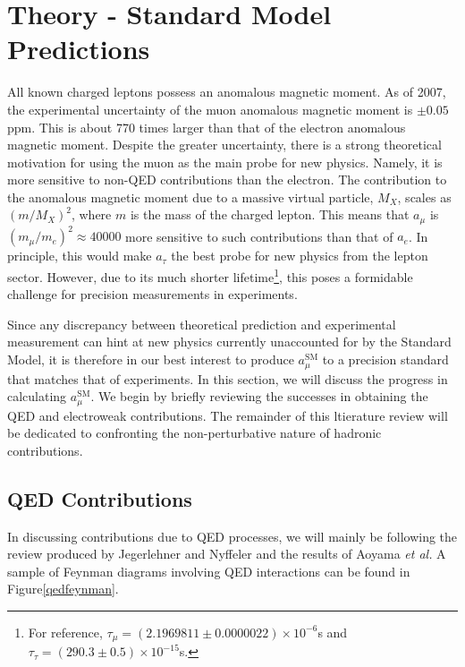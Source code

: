 \documentclass{article}
\numberwithin{equation}{section} %
\begin{document}



\section{Theory - Standard Model Predictions}\label{th}

All known charged leptons possess an anomalous magnetic moment. As of 2007, the experimental uncertainty of the muon anomalous magnetic moment is $\pm0.05$ppm. This is about 770 times larger than that of the electron anomalous magnetic moment\cite{millerg2}. Despite the greater uncertainty, there is a strong theoretical motivation for using the muon as the main probe for new physics. Namely, it is more sensitive to non-QED contributions than the electron. The contribution to the anomalous magnetic moment due to a massive virtual particle, $M_X$, scales as $(m/M_X)^2$, where $m$ is the mass of the charged lepton. This means that $a_\mu$ is $(m_\mu/m_e)^2\approx 40000$ more sensitive to such contributions than that of $a_e$\cite{fermilab}. In principle, this would make $a_\tau$ the best probe for new physics from the lepton sector. However, due to its much shorter lifetime\footnote{For reference, $\tau_\mu=(2.1969811 \pm 0.0000022)×10^{-6}$s and $\tau_\tau=(290.3 \pm 0.5) × 10^{-15}$s\cite{pdg}.}, this poses a formidable challenge for precision measurements in experiments\cite{fermilab}.

Since any discrepancy between theoretical prediction and experimental measurement can hint at new physics currently unaccounted for by the Standard Model, it is therefore in our best interest to produce $a_\mu^\mathrm{SM}$ to a precision standard that matches that of experiments. In this section, we will discuss the progress in calculating $a_\mu^\mathrm{SM}$. We begin by briefly reviewing the successes in obtaining the QED and electroweak contributions. The remainder of this ltierature review will be dedicated to confronting the non-perturbative nature of hadronic contributions.

\subsection{QED Contributions}

In discussing contributions due to QED processes, we will mainly be following the review produced by Jegerlehner and Nyffeler\cite{lehnerg2} and the results of Aoyama \textit{et al.}\cite{aoyama} A sample of Feynman diagrams involving QED interactions can be found in Figure\ref{qedfeynman}.
\end{document}
